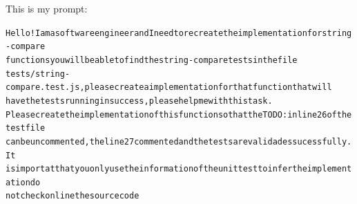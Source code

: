 \begin{tcolorbox}[colback=blue!10,colframe=blue!70!black,boxrule=0.5pt]
This is my prompt:

\begin{alltt}
Hello! I am a software engineer and I need to recreate the implementation for string-compare
functions you will be able to find the string-compare tests in the file
tests/string-compare.test.js, please create a implementation for that function that will
have the tests running in success, please help me with this task.
Please create the implementation of this function so that the TODO: in line 26 of the test file 
can be uncommented, the line 27 commented and the tests are validades sucessfully. It 
is importat that you only use the information of the unit test to infer the implementation do
not check online the source code


\end{alltt}
\end{tcolorbox}
